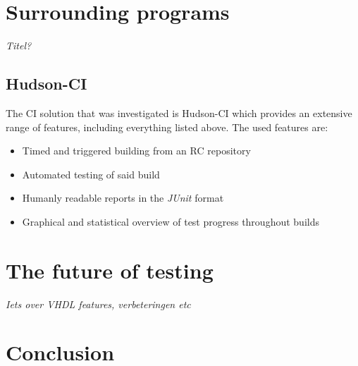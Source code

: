 \documentclass[11pt,british]{article}
\begin{document}
\section{Surrounding programs}
\emph{\color{red}Titel?}\\

\subsection{Hudson-CI}
\label{subsec:Hudson}
The \gls{CI} solution that was investigated is Hudson-CI which provides an extensive range of features, including everything listed above. The used features are:
\begin{itemize}
\item Timed and triggered building from an \gls{RC} repository
\item Automated testing of said build
\item Humanly readable reports in the \emph{JUnit} format
\item Graphical and statistical overview of test progress throughout builds
\end{itemize}

\newpage{}
\section{The future of testing}
\emph{\color{red} Iets over VHDL features, verbeteringen etc}

\newpage{}
\section{Conclusion}

\pagebreak{}

\printbibliography
\end{document}
